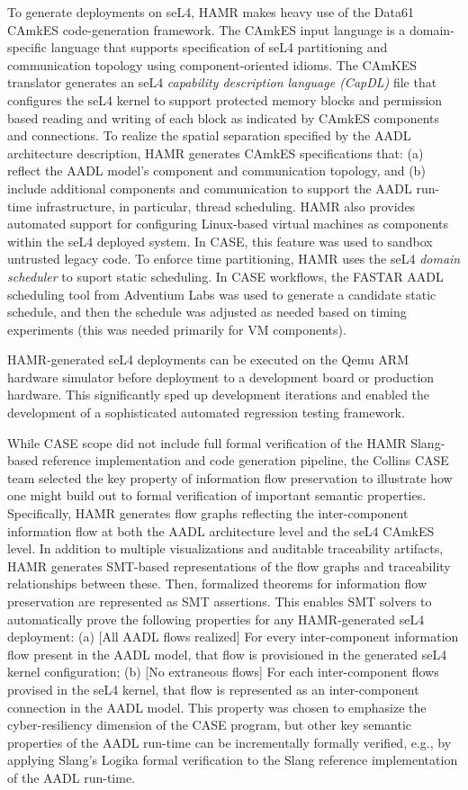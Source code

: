 To generate deployments on seL4, HAMR makes heavy use of the
Data61 CAmkES code-generation framework.   The CAmkES input
language is a domain-specific language that supports specification
of seL4 partitioning and communication topology using
component-oriented idioms.  The CAmKES translator generates an
seL4 \emph{capability description language (CapDL)} file that
configures the seL4 kernel to support protected memory blocks
and permission based reading and writing of each block as
indicated by CAmkES components and connections.
To realize the spatial separation specified by the AADL
architecture description, HAMR generates CAmkES specifications
that: (a) reflect the AADL model's component and communication
topology, and (b) include additional components and communication
to support the AADL run-time infrastructure, in particular,
thread scheduling.
HAMR also provides automated support for configuring Linux-based
virtual machines as components within the seL4 deployed system. 
In CASE, this feature was used to sandbox untrusted legacy code.
To enforce time partitioning, HAMR uses the seL4 \emph{domain
scheduler} to suport static scheduling.  In CASE workflows,
the FASTAR AADL scheduling tool from Adventium Labs was used
to generate a candidate static schedule, and then the schedule
was adjusted as needed based on timing experiments (this was
needed primarily for VM components).

HAMR-generated seL4 deployments can be executed on the Qemu ARM
hardware simulator before deployment to a development board or
production hardware.  This significantly sped up development
iterations and enabled the development of a sophisticated
automated regression testing framework.

While CASE scope did not include full formal verification of
the HAMR Slang-based reference implementation and code generation
pipeline, the Collins CASE team selected the key property of
information flow preservation to illustrate how one might build
out to formal verification of important semantic properties.
Specifically, HAMR generates flow graphs reflecting the
inter-component information flow at both the AADL architecture
level and the seL4 CAmkES level.  In addition to multiple
visualizations and auditable traceability artifacts, HAMR
generates SMT-based representations of the flow graphs and
traceability relationships between these.  Then, formalized
theorems for information flow preservation are represented as
SMT assertions.  This enables SMT solvers to automatically prove
the following properties for any HAMR-generated seL4 deployment:
(a) [All AADL flows realized] For every inter-component information
flow present in the AADL model, that flow is provisioned in the
generated seL4 kernel configuration;  (b) [No extraneous flows] For
each inter-component flows provised in the seL4 kernel, that
flow is represented as an inter-component connection in the
AADL model.   This property was chosen to emphasize the
cyber-resiliency dimension of the CASE program, but other
key semantic properties of the AADL run-time can be incrementally
formally verified, e.g., by applying Slang's Logika formal
verification to the Slang reference implementation of the
AADL run-time.  

